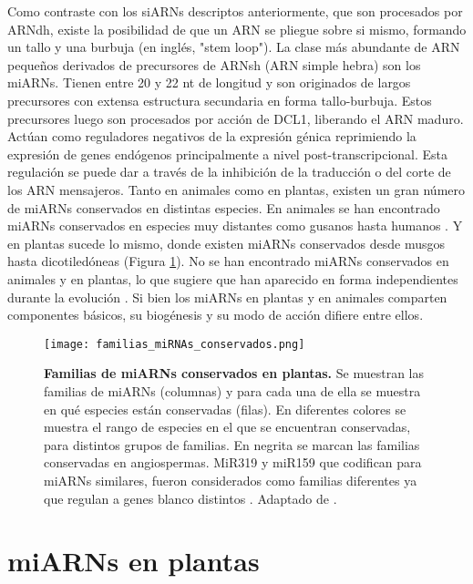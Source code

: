 Como contraste con los siARNs descriptos anteriormente, que son procesados por ARNdh, existe la posibilidad de que un ARN se pliegue sobre si mismo, formando un tallo y una burbuja (en inglés, "stem loop").
La clase más abundante de ARN pequeños derivados de precursores de ARNsh (ARN simple hebra) son los miARNs.
Tienen entre 20 y 22 nt de longitud y son originados de largos precursores con extensa estructura secundaria en forma tallo-burbuja.
Estos precursores luego son procesados por acción de DCL1, liberando el ARN maduro. 
Actúan como reguladores negativos de la expresión génica reprimiendo la expresión de genes endógenos principalmente a nivel post-transcripcional.
Esta regulación se puede dar a través de la inhibición de la traducción o del corte de los ARN mensajeros.
Tanto en animales como en plantas, existen un gran número de miARNs conservados en distintas especies.
En animales se han encontrado miARNs conservados en especies muy distantes como gusanos hasta humanos \citep{pmid11081512}.
Y en plantas sucede lo mismo, donde existen miARNs conservados desde musgos hasta dicotiledóneas \citep{pmid15849273,Axtell2008343,citeulike:8816489} (Figura \ref{fig:familias_miRNAs_conservados}).
No se han encontrado miARNs conservados en animales y en plantas, lo que sugiere que han aparecido en forma independientes durante la evolución \citep{citeulike:8816489}.
Si bien los miARNs en plantas y en animales comparten componentes básicos, su biogénesis y su modo de acción difiere entre ellos.


\begin{figure}[htbp!] 
    \centering    
    \texttt{[image: familias\_miRNAs\_conservados.png]}
    \caption[Familias de miARNs conservados en plantas]{
    \textbf{Familias de miARNs conservados en plantas.}
    Se muestran las familias de miARNs (columnas) y para cada una de ella se muestra en qué especies están conservadas (filas).
    En diferentes colores se muestra el rango de especies en el que se encuentran conservadas, para distintos grupos de familias.
    En negrita se marcan las familias conservadas en angiospermas. 
    MiR319 y miR159 que codifican para miARNs similares, fueron considerados como familias diferentes ya que regulan a genes blanco distintos \citep{Palatnik2007}.
    Adaptado de \citep{citeulike:8816489}.
    }
    \label{fig:familias_miRNAs_conservados}
\end{figure}

\section{miARNs en plantas}

